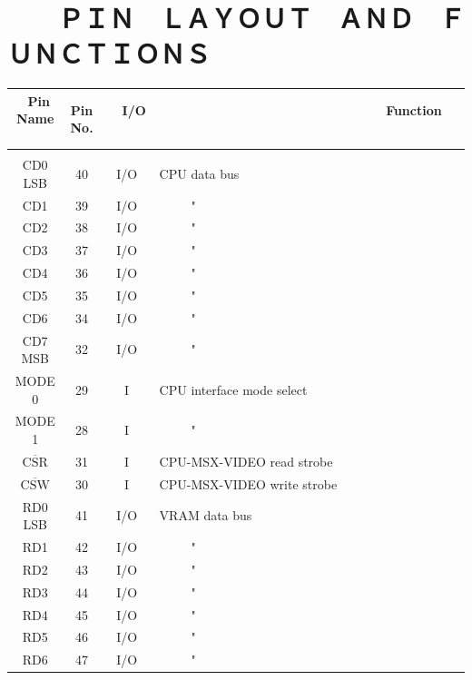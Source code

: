 \documentclass[a4paper,10pt]{article}
\begin{document}
\newpage

\section*{　　ＰＩＮ　ＬＡＹＯＵＴ　ＡＮＤ　ＦＵＮＣＴＩＯＮＳ}

\vspace{1.5em}

\fontsize{10pt}{10pt}\selectfont
\setlength{\arrayrulewidth}{0.1em}
\setlength{\tabcolsep}{0.5em}
\renewcommand{\arraystretch}{1.4}
\noindent \begin{tabular}{|c|c|c|l|}
\hline
\ Pin Name \ & Pin No. & \ \ I/O \ \ & \ \ \ \ \ \ \ \ \ \ \ \ \ \ \ \ \ \ \ \ \ \ \ \ \ \ \ \ \ \ \ Function \ \ \ \ \ \ \ \ \ \ \ \ \ \ \ \ \ \ \ \ \ \ \ \ \ \ \ \ \ \ \ \\
\hline \\[-2.8em]
CD0 LSB & 40 & I/O & CPU data bus\\[-1.04em]
CD1 & 39 & I/O & \ \ \ \ \ "\\[-1.04em]
CD2 & 38 & I/O & \ \ \ \ \ "\\[-1.04em]
CD3 & 37 & I/O & \ \ \ \ \ "\\[-1.04em]
CD4 & 36 & I/O & \ \ \ \ \ "\\[-1.04em]
CD5 & 35 & I/O & \ \ \ \ \ "\\[-1.04em]
CD6 & 34 & I/O & \ \ \ \ \ "\\[-1.04em]
CD7 MSB & 32 & I/O & \ \ \ \ \ "\\[-1.04em]
MODE 0 & 29 & I & CPU interface mode select\\[-1.04em]
MODE 1 & 28 & I & \ \ \ \ \ "\\[-1.04em]
$\overline{\mbox{CSR}}$ & 31 & I & CPU-MSX-VIDEO read strobe\\[-1.04em]
$\overline{\mbox{CSW}}$ & 30 & I & CPU-MSX-VIDEO write strobe\\[-1.04em]
RD0 LSB & 41 & I/O & VRAM data bus\\[-1.04em]
RD1 & 42 & I/O & \ \ \ \ \ "\\[-1.04em]
RD2 & 43 & I/O & \ \ \ \ \ "\\[-1.04em]
RD3 & 44 & I/O & \ \ \ \ \ "\\[-1.04em]
RD4 & 45 & I/O & \ \ \ \ \ "\\[-1.04em]
RD5 & 46 & I/O & \ \ \ \ \ "\\[-1.04em]
RD6 & 47 & I/O & \ \ \ \ \ "\\[-1.04em]

\end{tabular}
\end{document}
